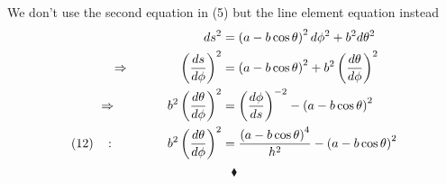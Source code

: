 We don't use the second equation in (5) but the line element equation instead
\begin{align}
ds^2&=\left(a-b\cos \theta \right)^2 d{\phi}^2+b^2 d\theta^2\\
\Rightarrow\quad\quad\quad\quad \left(\dv{s}{\phi}\right)^2 &= \left(a-b\cos \theta \right)^2 +b^2 \left(\dv{\theta}{\phi}\right)^2\\
\Rightarrow\quad\quad\quad\quad b^2 \left(\dv{\theta}{\phi}\right)^2 &= \left(\dv{\phi}{s}\right)^{-2 }- \left(a-b\cos \theta \right)^2 \\
\left(12\right)\quad \text{: }\quad\quad\quad\quad b^2 \left(\dv{\theta}{\phi}\right)^2 &= \frac{\left(a-b\cos \theta \right)^4}{h^2}- \left(a-b\cos \theta \right)^2
\end{align}
$$\blacklozenge$$
\newpage
